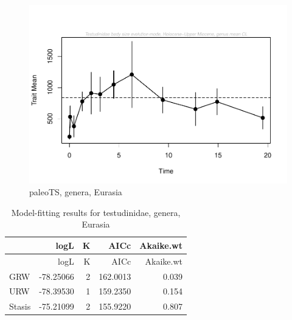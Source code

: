 \begin{figure}[H]
	\centering
	\includegraphics{MA_JJ_files/figure-latex/paleoTSEurasia-1.pdf}
	\caption{paleoTS, genera, Eurasia}
	\label{tab:pTSEus}
\end{figure}

\begin{longtable}[]{@{}lrrrr@{}}
	\caption{Model-fitting results for testudinidae, genera,
		Eurasia}
	\label{fig:pTSEs}\tabularnewline
	\toprule
	& logL & K & AICc & Akaike.wt\tabularnewline
	\midrule
	\endfirsthead
	\toprule
	& logL & K & AICc & Akaike.wt\tabularnewline
	\midrule
	\endhead
	GRW & -78.25066 & 2 & 162.0013 & 0.039\tabularnewline
	URW & -78.39530 & 1 & 159.2350 & 0.154\tabularnewline
	Stasis & -75.21099 & 2 & 155.9220 & 0.807\tabularnewline
	\bottomrule
\end{longtable}



\FloatBarrier

